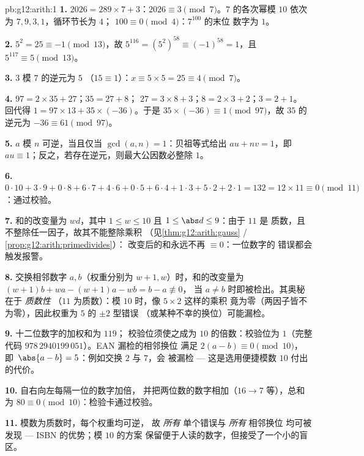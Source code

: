 \begin{solution}{pb:g12:arith:1}
\textbf{1.} $2026 = 289 \times 7 + 3$：$2026 \equiv 3
\pmod 7$。$7$ 的各次幂模 $10$ 依次为 $7, 9, 3, 1$，循环节长为 $4$；
$100 \equiv 0 \pmod 4$：$7^{100}$ 的末位
数字为 $1$。

\textbf{2.} $5^2 = 25 \equiv -1 \pmod{13}$，故
$5^{116} = \left(5^2\right)^{58} \equiv (-1)^{58} = 1$，且
$5^{117} \equiv 5 \pmod{13}$。

\textbf{3.} $3$ 模 $7$ 的逆元为 $5$
（$15 \equiv 1$）：$x \equiv 5 \times 5 = 25 \equiv 4 \pmod 7$。

\textbf{4.} $97 = 2 \times 35 + 27$；$35 = 27 + 8$；
$27 = 3 \times 8 + 3$；$8 = 2 \times 3 + 2$；$3 = 2 + 1$。
回代得 $1 = 97 \times 13 + 35 \times (-36)$。于是
$35 \times (-36) \equiv 1 \pmod{97}$，故 $35$ 的逆元为
$-36 \equiv 61 \pmod{97}$。

\textbf{5.} $a$ 模 $n$ 可逆，当且仅当
$\gcd(a, n) = 1$：贝祖等式给出 $au + nv = 1$，即\
$au \equiv 1$；反之，若存在逆元，则最大公因数必整除
$1$。

\textbf{6.} $0{\cdot}10 + 3{\cdot}9 + 0{\cdot}8 + 6{\cdot}7 +
4{\cdot}6 + 0{\cdot}5 + 6{\cdot}4 + 1{\cdot}3 + 5{\cdot}2 +
2{\cdot}1 = 132 = 12 \times 11 \equiv 0 \pmod{11}$：通过校验。

\textbf{7.} 和的改变量为 $wd$，其中
$1 \leq w \leq 10$ 且 $1 \leq \abs d \leq 9$：由于 $11$ 是
质数，且不整除任一因子，故其不能整除乘积
（见\cref{thm:g12:arith:gauss} / \cref{prop:g12:arith:primedivides}）：
改变后的和永远不再 $\equiv 0$：一位数字的
错误都会触发报警。

\textbf{8.} 交换相邻数字 $a, b$（权重分别为
$w + 1, w$）时，和的改变量为
$(w+1)b + wa - (w+1)a - wb = b - a \not\equiv 0$，
当 $a \neq b$ 时即被检出。其奥秘在于 \emph{质数性}
（$11$ 为质数）：模 $10$ 时，像 $5 \times 2$ 这样的乘积
竟为零（两因子皆不为零），因此权重为 $5$ 的 $\pm 2$ 型错误
（或某种不幸的换位）可能漏检。

\textbf{9.} 十二位数字的加权和为 $119$；
校验位须使之成为 $10$ 的倍数：校验位为 $1$（完整
代码 $978\,2940199\,051$）。EAN 漏检的相邻换位
满足 $2(a - b) \equiv 0 \pmod{10}$，即\
$\abs{a - b} = 5$：例如交换 $2$ 与 $7$，会
被漏检 --- 这是选用便捷模数 $10$ 付出的代价。

\textbf{10.} 自右向左每隔一位的数字加倍，
并把两位数的数字相加（$16 \to 7$ 等），总和为 $80 \equiv 0
\pmod{10}$：检验卡通过校验。

\textbf{11.} 模数为质数时，每个权重均可逆，
故 \emph{所有} 单个错误与 \emph{所有} 相邻换位
均可被发现 --- ISBN 的优势；模 $10$ 的方案
保留便于人读的数字，但接受了一个小的盲区。


\end{solution}
